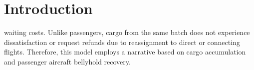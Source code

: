 \documentclass[opre,sglanonrev]{informs4}
\begin{document}





\ARTICLEAUTHORS{%
}

%




\maketitle

\section{Introduction}
waiting costs.
Unlike passengers, cargo from the same batch does not experience dissatisfaction or request refunds %
due to reassignment to direct or connecting flights. Therefore, this model employs a narrative based on cargo %
accumulation and passenger aircraft bellyhold recovery. 
\end{document}
